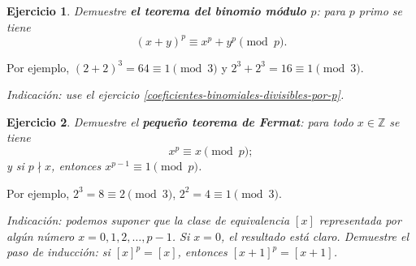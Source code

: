 \documentclass{article}
\newcommand{\ZZ}{\mathbb{Z}}
\newcommand{\term}{\textbf}
\theoremstyle{plain}
\newtheorem{ejerc}{Ejercicio}
\newif\ifsol
\begin{document}
\ifsol\begin{proof}[Segunda solución]
El valor inicial es
$${p-1\choose 0} = 1.$$
Luego, para $i = 1,\ldots,p-1$ tenemos
$${p-1 \choose i} + {p-1 \choose i-1} = {p\choose i} \equiv 0 \pmod{p},$$
es decir,

\begin{align*}
{p-1 \choose 1} & \equiv -{p-1\choose 0} \equiv -1 \pmod{p},\\
{p-1 \choose 2} & \equiv -{p-1\choose 1} \equiv +1 \pmod{p},\\
 & \cdots \\
{p-1 \choose i} & \equiv (-1)^i \pmod{p}.
\end{align*}

\vspace{1em}
\end{proof}\fi

\begin{ejerc}
Demuestre \term{el teorema del binomio módulo $p$}: para $p$ primo se tiene
$$(x+y)^p \equiv x^p + y^p \pmod{p}.$$
\end{ejerc}

\noindent Por ejemplo, $(2+2)^3 = 64 \equiv 1 \pmod{3}$ y $2^3 + 2^3 = 16 \equiv 1 \pmod{3}$.

\noindent\emph{Indicación: use el ejercicio \ref{coeficientes-binomiales-divisibles-por-p}.}

\ifsol\begin{proof}[Solución (Alejandra)]
El teorema del binomio nos dice que
$$(x+y)^p = \sum_{0 \le i \le p} {p \choose i} x^{p-i} \, y^i,$$
pero módulo $p$ los coeficientes ${p \choose i}$ son nulos, excepto ${p \choose 0} = {p\choose p} = 1$.
\end{proof}\fi

\begin{ejerc}
\label{pequeno-fermat}
Demuestre el \term{pequeño teorema de Fermat}: para todo $x \in \ZZ$ se tiene
$$x^p \equiv x \pmod{p};$$
y si $p \nmid x$, entonces $x^{p-1} \equiv 1 \pmod{p}$.
\end{ejerc}

\noindent Por ejemplo, $2^3 = 8 \equiv 2 \pmod{3}$, $2^2 = 4 \equiv 1 \pmod{3}$.

\noindent\emph{Indicación: podemos suponer que la clase de equivalencia $[x]$ representada por algún número $x = 0,1,2,\ldots, p-1$. Si $x = 0$, el resultado está claro. Demuestre el paso de inducción: si $[x]^p = [x]$, entonces $[x+1]^p = [x+1]$.}
\end{document}
